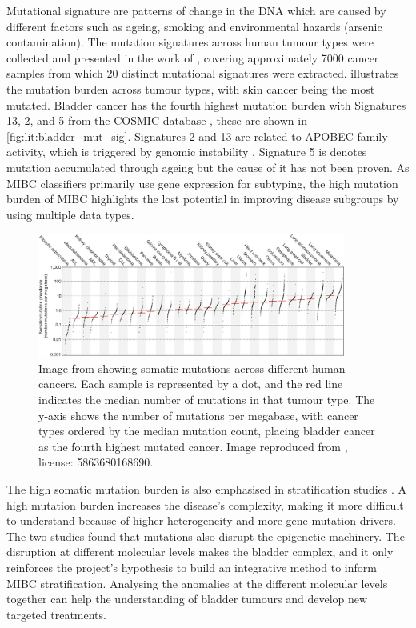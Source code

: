 Mutational signature are patterns of change in the DNA which are caused by different factors such as ageing, smoking and environmental hazards (arsenic contamination). The mutation signatures across human tumour types were collected and presented in the work of \citeauthor{Alexandrov2013-gi}, covering approximately 7000 cancer samples from which 20 distinct mutational signatures were extracted.  illustrates the mutation burden across tumour types, with skin cancer being the most mutated. Bladder cancer has the fourth highest mutation burden with Signatures 13, 2, and 5 from the COSMIC database \citep{Tate2019-yj}, these are shown in \cref{fig:lit:bladder_mut_sig}. Signatures 2 and 13 are related to APOBEC family activity, which is triggered by genomic instability \citep{Baker2022-xw}. Signature 5 is denotes mutation accumulated through ageing but the cause of it has not been proven. As MIBC classifiers primarily use gene expression for subtyping, the high mutation burden of MIBC highlights the lost potential in improving disease subgroups by using multiple data types.

\begin{figure}[!t]    
    \centering
\includegraphics[width=0.9\textwidth,height=0.9\textheight,keepaspectratio]{Sections/Lit_review/Resources/mut_sig_cancers.jpg}
    \caption[Somatic mutations across human cancers]{Image from \cite{Alexandrov2013-gi} showing somatic mutations across different human cancers. Each sample is represented by a dot, and the red line indicates the median number of mutations in that tumour type. The y-axis shows the number of mutations per megabase, with cancer types ordered by the median mutation count, placing bladder cancer as the fourth highest mutated cancer. Image reproduced from \citep{Alexandrov2013-gi}, license: 5863680168690. }
    \label{fig:lit:cancer_mut_sig}
\end{figure}

The high somatic mutation burden is also emphasised in stratification studies \citep{Tcga2014-dr, Robertson2017-mg, Kamoun2020-tj}. A high mutation burden increases the disease's complexity, making it more difficult to understand because of higher heterogeneity and more gene mutation drivers. The two studies \citep{Tcga2014-dr, Robertson2017-mg} found that mutations also disrupt the epigenetic machinery. The disruption at different molecular levels makes the bladder complex, and it only reinforces the project's hypothesis to build an integrative method to inform MIBC stratification. Analysing the anomalies at the different molecular levels together can help the understanding of bladder tumours and develop new targeted treatments.


